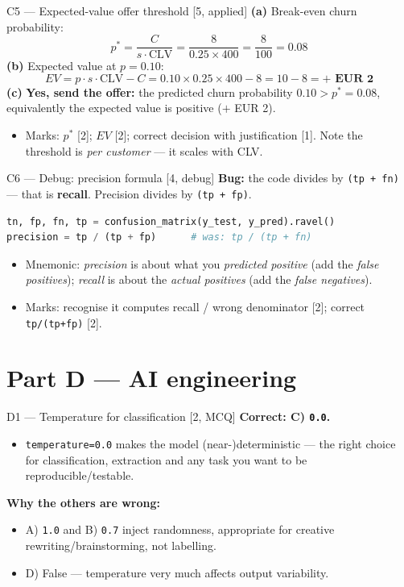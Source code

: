 \documentclass[aspectratio=169,11pt]{beamer}
\begin{document}
\begin{frame}[fragile]{C5 --- Expected-value offer threshold \hfill [5, applied]}
\textbf{(a)} Break-even churn probability:
\[
p^{*} = \frac{C}{s \cdot \text{CLV}} = \frac{8}{0.25 \times 400} = \frac{8}{100} = 0.08
\]
\textbf{(b)} Expected value at $p = 0.10$:
\[
EV = p \cdot s \cdot \text{CLV} - C = 0.10 \times 0.25 \times 400 - 8 = 10 - 8 = \boldsymbol{+\text{ EUR }2}
\]
\textbf{(c)} \textbf{Yes, send the offer:} the predicted churn probability $0.10 > p^{*} = 0.08$, equivalently the expected value is positive ($+$ EUR 2).
\begin{itemize}
  \item Marks: $p^{*}$ [2]; $EV$ [2]; correct decision with justification [1]. Note the threshold is \emph{per customer} --- it scales with CLV.
\end{itemize}
\end{frame}

\begin{frame}[fragile]{C6 --- Debug: precision formula \hfill [4, debug]}
\textbf{Bug:} the code divides by \texttt{(tp + fn)} --- that is \textbf{recall}. Precision divides by \texttt{(tp + fp)}.
\begin{lstlisting}[language=Python]
tn, fp, fn, tp = confusion_matrix(y_test, y_pred).ravel()
precision = tp / (tp + fp)      # was: tp / (tp + fn)
\end{lstlisting}
\begin{itemize}
  \item Mnemonic: \emph{precision} is about what you \emph{predicted positive} (add the \emph{false positives}); \emph{recall} is about the \emph{actual positives} (add the \emph{false negatives}).
  \item Marks: recognise it computes recall / wrong denominator [2]; correct \texttt{tp/(tp+fp)} [2].
\end{itemize}
\end{frame}

\section{Part D --- AI engineering}

\begin{frame}{D1 --- Temperature for classification \hfill [2, MCQ]}
\textbf{Correct: C) \texttt{0.0}.}
\begin{itemize}
  \item \texttt{temperature=0.0} makes the model (near-)deterministic --- the right choice for classification, extraction and any task you want to be reproducible/testable.
\end{itemize}
\textbf{Why the others are wrong:}
\begin{itemize}
  \item A) \texttt{1.0} and B) \texttt{0.7} inject randomness, appropriate for creative rewriting/brainstorming, not labelling.
  \item D) False --- temperature very much affects output variability.
\end{itemize}
\end{frame}
\end{document}
